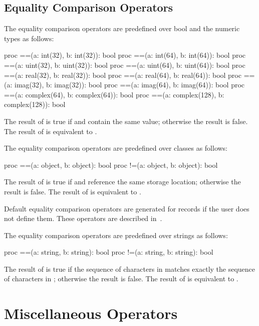 \subsection{Equality Comparison Operators}
\label{Equality_Comparison_Operators}

The equality comparison operators are predefined over bool and the
numeric types as follows:
\begin{chapel}
proc ==(a: int(32), b: int(32)): bool
proc ==(a: int(64), b: int(64)): bool
proc ==(a: uint(32), b: uint(32)): bool
proc ==(a: uint(64), b: uint(64)): bool
proc ==(a: real(32), b: real(32)): bool
proc ==(a: real(64), b: real(64)): bool
proc ==(a: imag(32), b: imag(32)): bool
proc ==(a: imag(64), b: imag(64)): bool
proc ==(a: complex(64), b: complex(64)): bool
proc ==(a: complex(128), b: complex(128)): bool
\end{chapel}
The result of  is true if  and  contain
the same value; otherwise the result is false.  The result of  is equivalent to .

The equality comparison operators are predefined over classes as
follows:
\begin{chapel}
proc ==(a: object, b: object): bool
proc !=(a: object, b: object): bool
\end{chapel}
The result of  is true if  and  reference
the same storage location; otherwise the result is false.  The result
of  is equivalent to .

Default equality comparison operators are generated for records if the
user does not define them.  These operators are described
in~.

The equality comparison operators are predefined over strings as
follows:
\begin{chapel}
proc ==(a: string, b: string): bool
proc !=(a: string, b: string): bool
\end{chapel}
The result of  is true if the sequence of characters
in  matches exactly the sequence of characters in ;
otherwise the result is false.  The result of  is
equivalent to .

\section{Miscellaneous Operators}
\label{Miscellaneous_Operators}

